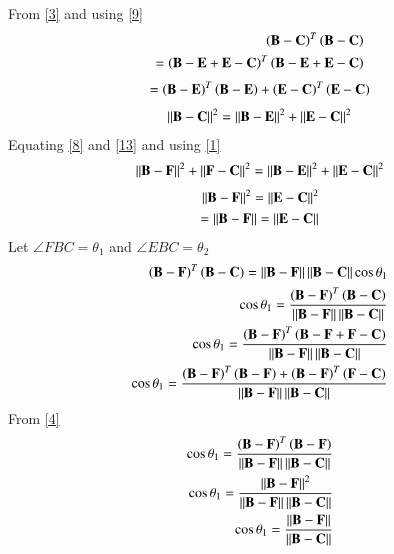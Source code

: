 \documentclass[journal,12pt,twocolumn]{IEEEtran}
\begin{document}
From  \eqref{3} and using \eqref{9}  
\begin{align}
    \left(\mathbf{B}-\mathbf{C}\right)^T\left(\mathbf{B}-\mathbf{C}\right)\\
    =\left(\mathbf{B}-\mathbf{E}+\mathbf{E}-\mathbf{C}\right)^T\left(\mathbf{B}-\mathbf{E}+\mathbf{E}-\mathbf{C}\right)
    \end{align}
    \begin{align}
      =\left(\mathbf{B}-\mathbf{E}\right)^T\left(\mathbf{B}-\mathbf{E}\right)+\left(\mathbf{E}-\mathbf{C}\right)^T\left(\mathbf{E}-\mathbf{C}\right) 
    \end{align}
\begin{align}
   \left\lVert\mathbf{B}-\mathbf{C}\right\rVert^2=\left\lVert\mathbf{B}-\mathbf{E}\right\rVert^2+\left\lVert\mathbf{E}-\mathbf{C}\right\rVert^2\label{13}
    \end{align}        
    Equating \eqref{8} and \eqref{13} and using \eqref{1}
    \begin{align}
      \left\lVert\mathbf{B}-\mathbf{F}\right\rVert^2+\left\lVert\mathbf{F}-\mathbf{C}\right\rVert^2 = \left\lVert\mathbf{B}-\mathbf{E}\right\rVert^2+\left\lVert\mathbf{E}-\mathbf{C}\right\rVert^2  
    \end{align}
    \begin{align}
       \left\lVert\mathbf{B}-\mathbf{F}\right\rVert^2=\left\lVert\mathbf{E}-\mathbf{C}\right\rVert^2\\
       =\left\lVert\mathbf{B}-\mathbf{F}\right\rVert=\left\lVert\mathbf{E}-\mathbf{C}\right\rVert\label{16}
    \end{align}
Let $\angle FBC=\theta_1$  and  $\angle EBC=\theta_2$
    \begin{align}
        \left(\mathbf{B}-\mathbf{F}\right)^T\left(\mathbf{B}-\mathbf{C}\right)=\left\lVert\mathbf{B}-\mathbf{F}\right\rVert\left\lVert\mathbf{B}-\mathbf{C}\right\rVert\cos\theta_1\\
        \cos{\theta_1}=\frac{\left(\mathbf{B}-\mathbf{F}\right)^T\left(\mathbf{B}-\mathbf{C}\right)}{\left\lVert\mathbf{B}-\mathbf{F}\right\rVert\left\lVert\mathbf{B}-\mathbf{C}\right\rVert}\\
        \cos{\theta_1}=\frac{\left(\mathbf{B}-\mathbf{F}\right)^T\left(\mathbf{B}-\mathbf{F}+\mathbf{F}-\mathbf{C}\right)}{\left\lVert\mathbf{B}-\mathbf{F}\right\rVert\left\lVert\mathbf{B}-\mathbf{C}\right\rVert}\\
        \cos{\theta_1}=\frac{\left(\mathbf{B}-\mathbf{F}\right)^T\left(\mathbf{B}-\mathbf{F}\right) +\left(\mathbf{B}-\mathbf{F}\right)^T\left(\mathbf{F}-\mathbf{C}\right)}{\left\lVert\mathbf{B}-\mathbf{F}\right\rVert\left\lVert\mathbf{B}-\mathbf{C}\right\rVert}
        \end{align}
        From \eqref{4}
        \begin{align}
          \cos{\theta_1}=\frac{\left(\mathbf{B}-\mathbf{F}\right)^T\left(\mathbf{B}-\mathbf{F}\right)}{\left\lVert\mathbf{B}-\mathbf{F}\right\rVert\left\lVert\mathbf{B}-\mathbf{C}\right\rVert} \\
          \cos{\theta_1}=\frac{\left\lVert\mathbf{B}-\mathbf{F}\right\rVert^2}{\left\lVert\mathbf{B}-\mathbf{F}\right\rVert\left\lVert\mathbf{B}-\mathbf{C}\right\rVert}\\
          \cos{\theta_1}=\frac{\left\lVert\mathbf{B}-\mathbf{F}\right\rVert}{\left\lVert\mathbf{B}-\mathbf{C}\right\rVert}
        \end{align}
\end{document}
